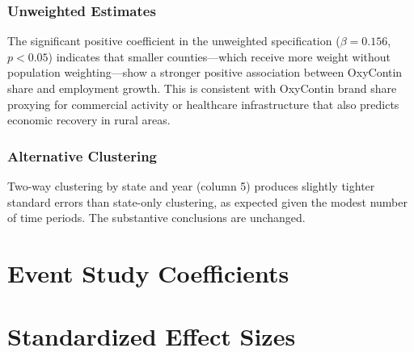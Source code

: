 \documentclass[12pt]{article}
\begin{document}
\subsubsection*{Unweighted Estimates} The significant positive coefficient in the unweighted specification ($\beta = 0.156$, $p < 0.05$) indicates that smaller counties---which receive more weight without population weighting---show a stronger positive association between OxyContin share and employment growth. This is consistent with OxyContin brand share proxying for commercial activity or healthcare infrastructure that also predicts economic recovery in rural areas.

\subsubsection*{Alternative Clustering} Two-way clustering by state and year (column 5) produces slightly tighter standard errors than state-only clustering, as expected given the modest number of time periods. The substantive conclusions are unchanged.


\section{Event Study Coefficients}
\label{app:eventstudy}




\section{Standardized Effect Sizes}
\label{sec:sde}


\end{document}
